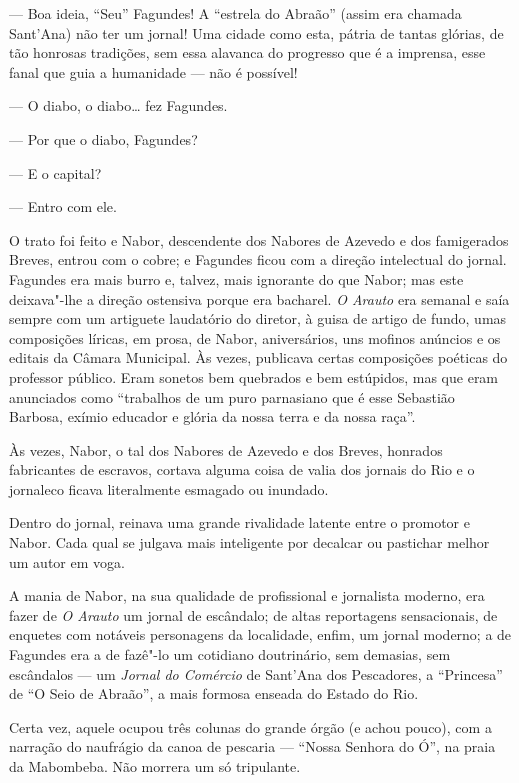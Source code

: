 --- Boa ideia, ``Seu'' Fagundes! A ``estrela do Abraão'' (assim era
chamada Sant'Ana) não ter um jornal! Uma cidade como esta, pátria de
tantas glórias, de tão honrosas tradições, sem essa alavanca do
progresso que é a imprensa, esse fanal que guia a humanidade --- não é
possível!

--- O diabo, o diabo\ldots{} fez Fagundes.

--- Por que o diabo, Fagundes?

--- E o capital?

--- Entro com ele.

O trato foi feito e Nabor, descendente dos Nabores de Azevedo e dos
famigerados Breves, entrou com o cobre; e Fagundes ficou com a direção
intelectual do jornal. Fagundes era mais burro e, talvez, mais ignorante
do que Nabor; mas este deixava"-lhe a direção ostensiva porque era
bacharel. \emph{O Arauto} era semanal e saía sempre com um artiguete
laudatório do diretor, à guisa de artigo de fundo, umas composições
líricas, em prosa, de Nabor, aniversários, uns mofinos anúncios e os
editais da Câmara Municipal. Às vezes, publicava certas composições
poéticas do professor público. Eram sonetos bem quebrados e bem
estúpidos, mas que eram anunciados como ``trabalhos de um puro
parnasiano que é esse Sebastião Barbosa, exímio educador e glória da
nossa terra e da nossa raça''.

Às vezes, Nabor, o tal dos Nabores de Azevedo e dos Breves, honrados
fabricantes de escravos, cortava alguma coisa de valia dos jornais do
Rio e o jornaleco ficava literalmente esmagado ou inundado.

Dentro do jornal, reinava uma grande rivalidade latente entre o promotor
e Nabor. Cada qual se julgava mais inteligente por decalcar ou pastichar
melhor um autor em voga.

A mania de Nabor, na sua qualidade de profissional e jornalista moderno,
era fazer de \emph{O Arauto} um jornal de escândalo; de altas
reportagens sensacionais, de enquetes com notáveis personagens da
localidade, enfim, um jornal moderno; a de Fagundes era a de fazê"-lo um
cotidiano doutrinário, sem demasias, sem escândalos --- um \emph{Jornal
do Comércio} de Sant'Ana dos Pescadores, a ``Princesa'' de ``O Seio de
Abraão'', a mais formosa enseada do Estado do Rio.

Certa vez, aquele ocupou três colunas do grande órgão (e achou pouco),
com a narração do naufrágio da canoa de pescaria --- ``Nossa Senhora do
Ó'', na praia da Mabombeba. Não morrera um só tripulante.

